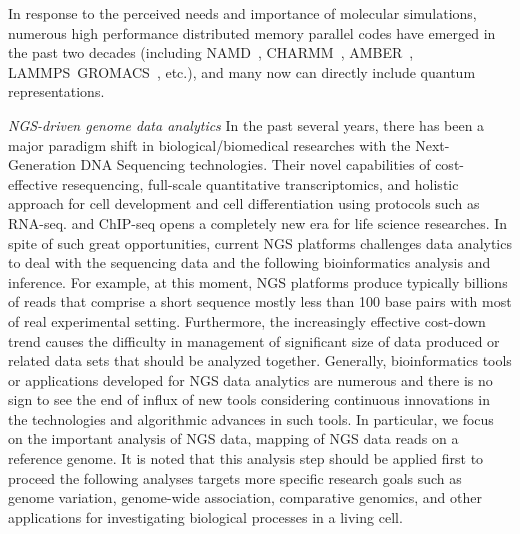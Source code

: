 \documentclass{sig-alternate}
\begin{document}

In response to the perceived needs and importance of molecular
simulations, numerous high performance distributed memory parallel codes
have emerged in the past two decades (including NAMD~\cite{cheatham-3},
CHARMM~\cite{cheatham-4}, AMBER~\cite{cheatham-5},
LAMMPS~\cite{lammps}GROMACS~\cite{cheatham-6}, etc.), and many now can
directly include quantum representations. 





\textit{NGS-driven genome data analytics}
In the past several years, there has been a major paradigm shift in biological/biomedical researches with the Next-Generation DNA Sequencing technologies\cite{mardis2008-tig,metzker2010,mardis2008-arghg}.  Their novel capabilities of cost-effective resequencing, full-scale quantitative transcriptomics, and holistic approach for cell development and cell differentiation using protocols such as RNA-seq. and ChIP-seq opens a completely new era for life science researches\cite{sorek2010,mortazavi2008}.  In spite of such great opportunities, current NGS platforms challenges data analytics to deal with the sequencing data and the following bioinformatics analysis and inference.  For example, at this moment, NGS platforms produce typically billions of reads that comprise a short sequence mostly less than 100 base pairs with most of real experimental setting\cite{alex2009,trapnell2009}.  Furthermore, the increasingly effective cost-down trend causes the difficulty in management of significant size of data produced or related data sets that should be analyzed together.  
Generally, bioinformatics tools or applications developed for NGS data analytics are numerous and there is no sign to see the end of influx of new tools considering continuous innovations in the technologies and algorithmic advances in such tools.  In particular, we focus on the  important analysis of NGS data, mapping of NGS data reads on a reference genome.  It is noted that this analysis step should be applied first to proceed the following analyses targets more specific research goals such as genome variation, genome-wide association, comparative genomics, and other applications for investigating biological processes in a living cell.     
\end{document}
